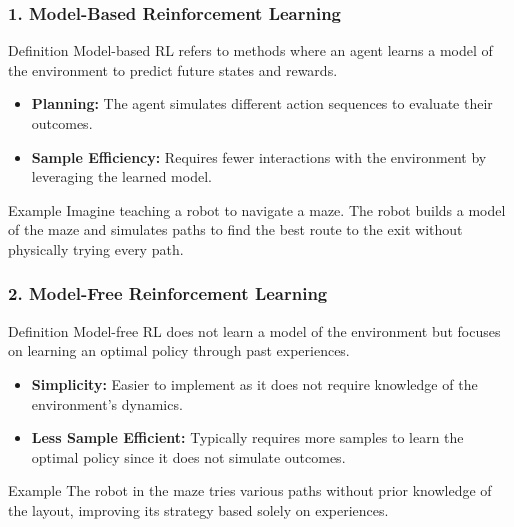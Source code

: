 \documentclass[aspectratio=169]{beamer}
\begin{document}
\begin{frame}[fragile]
    \frametitle{1. Model-Based Reinforcement Learning}
    
    \begin{block}{Definition}
        Model-based RL refers to methods where an agent learns a model of the environment to predict future states and rewards.
    \end{block}
    
    \begin{itemize}
        \item \textbf{Planning:} The agent simulates different action sequences to evaluate their outcomes.
        \item \textbf{Sample Efficiency:} Requires fewer interactions with the environment by leveraging the learned model.
    \end{itemize}
    
    \begin{block}{Example}
        Imagine teaching a robot to navigate a maze. 
        The robot builds a model of the maze and simulates paths to find the best route to the exit without physically trying every path.
    \end{block}
\end{frame}

\begin{frame}[fragile]
    \frametitle{2. Model-Free Reinforcement Learning}
    
    \begin{block}{Definition}
        Model-free RL does not learn a model of the environment but focuses on learning an optimal policy through past experiences.
    \end{block}
    
    \begin{itemize}
        \item \textbf{Simplicity:} Easier to implement as it does not require knowledge of the environment's dynamics.
        \item \textbf{Less Sample Efficient:} Typically requires more samples to learn the optimal policy since it does not simulate outcomes.
    \end{itemize}
    
    \begin{block}{Example}
        The robot in the maze tries various paths without prior knowledge of the layout, improving its strategy based solely on experiences.
    \end{block}
\end{frame}
\end{document}
